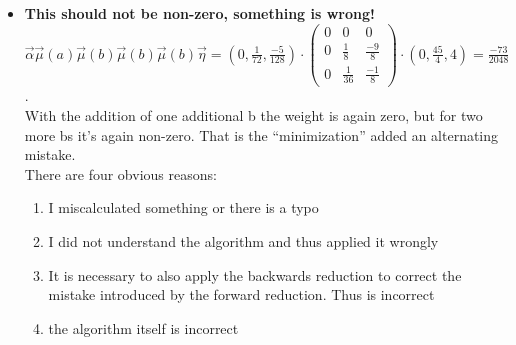 \begin{itemize}
            \item \textbf{This should not be non-zero, something is wrong!}\\
            $\overrightarrow{\alpha} \overrightarrow{\mu}(a) \overrightarrow{\mu}(b) \overrightarrow{\mu}(b) \overrightarrow{\mu}(b) \overrightarrow{\eta} = ( 0, \frac{1}{72}, \frac{-5}{128}) \cdot \begin{pmatrix}
                    0 & 0 & 0 \\
                    0 & \frac{1}{8} & \frac{-9}{8} \\
                    0 & \frac{1}{36} & \frac{-1}{8} 
                \end{pmatrix} \cdot (0, \frac{45}{4}, 4) = \frac{-73}{2048}$. \\
                With the addition of one additional b the weight is again zero, but for two more bs it's again non-zero. That is the ``minimization'' added an alternating mistake. \\
                There are four obvious reasons:
                \begin{enumerate}
                 \item I miscalculated something or there is a typo
                 \item I did not understand the algorithm and thus applied it wrongly
                 \item It is necessary to also apply the backwards reduction to correct the mistake introduced by the forward reduction. Thus \autocite{kiefer2014stability} is incorrect
                 \item the algorithm itself is incorrect
                \end{enumerate}                

        \end{itemize}
            
